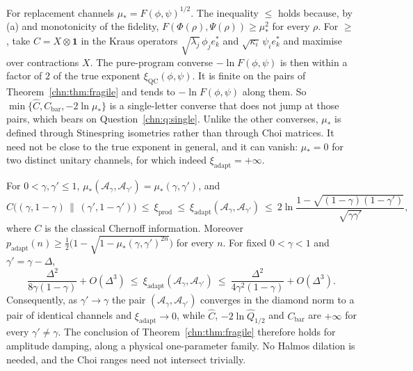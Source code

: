 For replacement channels $\mu_*=F(\phi,\psi)^{1/2}$. The inequality $\le$ holds because, by (a) and monotonicity of the fidelity, $F(\Phi(\rho),\Psi(\rho))\ge\mu_*^2$ for every $\rho$. For $\ge$, take $C=X\otimes\mathbf 1$ in the Kraus operators $\sqrt{\lambda_j}\,\phi_je_k^*$ and $\sqrt{\kappa_i}\,\psi_ie_k^*$ and maximise over contractions $X$. The pure-program converse $-\ln F(\phi,\psi)$ is then within a factor of $2$ of the true exponent $\xi_{\mathrm{QC}}(\phi,\psi)$. It is finite on the pairs of Theorem~\ref{chn:thm:fragile} and tends to $-\ln F(\phi,\psi)$ along them. So $\min\{\widehat C,C_{\mathrm{bar}},-2\ln\mu_*\}$ is a single-letter converse that does not jump at those pairs, which bears on Question~\ref{chn:q:single}. Unlike the other converses, $\mu_*$ is defined through Stinespring isometries rather than through Choi matrices. It need not be close to the true exponent in general, and it can vanish: $\mu_*=0$ for two distinct unitary channels, for which indeed $\xi_{\mathrm{adapt}}=+\infty$.

\begin{corollary}\label{chn:cor:adfragile}
For $0<\gamma,\gamma'\le1$, $\mu_*(\mathcal A_\gamma,\mathcal A_{\gamma'})=\mu_*(\gamma,\gamma')$, and
\[
C\big((\gamma,1-\gamma)\,\|\,(\gamma',1-\gamma')\big)\ \le\ \xi_{\mathrm{prod}}\ \le\ \xi_{\mathrm{adapt}}(\mathcal A_\gamma,\mathcal A_{\gamma'})\ \le\ 2\ln\frac{1-\sqrt{(1-\gamma)(1-\gamma')}}{\sqrt{\gamma\gamma'}},
\]
where $C$ is the classical Chernoff information. Moreover $p_{\mathrm{adapt}}(n)\ge\frac12\big(1-\sqrt{1-\mu_*(\gamma,\gamma')^{2n}}\big)$ for every $n$. For fixed $0<\gamma<1$ and $\gamma'=\gamma-\Delta$,
\[
\frac{\Delta^2}{8\gamma(1-\gamma)}+O(\Delta^3)\ \le\ \xi_{\mathrm{adapt}}(\mathcal A_\gamma,\mathcal A_{\gamma'})\ \le\ \frac{\Delta^2}{4\gamma^2(1-\gamma)}+O(\Delta^3).
\]
Consequently, as $\gamma'\to\gamma$ the pair $(\mathcal A_\gamma,\mathcal A_{\gamma'})$ converges in the diamond norm to a pair of identical channels and $\xi_{\mathrm{adapt}}\to0$, while $\widehat C$, $-2\ln\widehat Q_{1/2}$ and $C_{\mathrm{bar}}$ are $+\infty$ for every $\gamma'\ne\gamma$. The conclusion of Theorem~\ref{chn:thm:fragile} therefore holds for amplitude damping, along a physical one-parameter family. No Halmos dilation is needed, and the Choi ranges need not intersect trivially.
\end{corollary}

